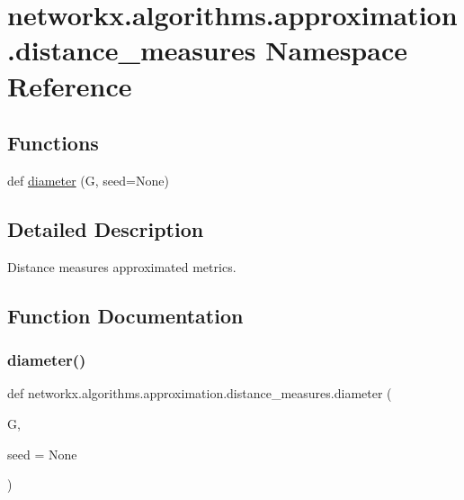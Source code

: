 \hypertarget{namespacenetworkx_1_1algorithms_1_1approximation_1_1distance__measures}{}\section{networkx.\+algorithms.\+approximation.\+distance\+\_\+measures Namespace Reference}
\label{namespacenetworkx_1_1algorithms_1_1approximation_1_1distance__measures}
\subsection*{Functions}
\begin{DoxyCompactItemize}
\item 
def \hyperlink{namespacenetworkx_1_1algorithms_1_1approximation_1_1distance__measures_a53c235731afbca3c16b7560d02b3a273}{diameter} (G, seed=None)
\end{DoxyCompactItemize}


\subsection{Detailed Description}
\begin{DoxyVerb}Distance measures approximated metrics.\end{DoxyVerb}
 

\subsection{Function Documentation}
\mbox{\label{namespacenetworkx_1_1algorithms_1_1approximation_1_1distance__measures_a53c235731afbca3c16b7560d02b3a273}} 
\subsubsection{\texorpdfstring{diameter()}{diameter()}}
{\footnotesize\ttfamily def networkx.\+algorithms.\+approximation.\+distance\+\_\+measures.\+diameter (\begin{DoxyParamCaption}\item[{}]{G,  }\item[{}]{seed = {\ttfamily None} }\end{DoxyParamCaption})}

